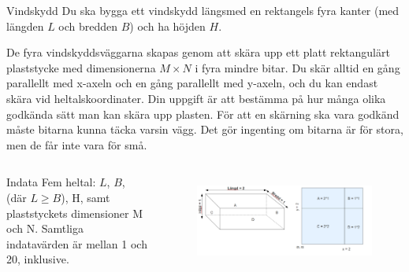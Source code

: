 \documentclass[10pt]{beamer}
\begin{document}
\begin{frame}[fragile]{Vindskydd}
Du ska bygga ett vindskydd längsmed en rektangels fyra kanter (med längden $L$ och bredden $B$) och ha höjden $H$.

De fyra vindskyddsväggarna skapas genom att skära upp ett platt rektangulärt plaststycke med dimensionerna $M \times N$ i fyra mindre bitar. Du skär alltid en gång parallellt med x-axeln och en gång parallellt med y-axeln, och du kan endast skära vid heltalskoordinater. Din uppgift är att bestämma på hur många olika godkända sätt man kan skära upp plasten. För att en skärning ska vara godkänd måste bitarna kunna täcka varsin vägg. Det gör ingenting om bitarna är för stora, men de får inte vara för små.

\vspace{-3mm}

  \begin{columns}[T,onlytextwidth]

\begin{exampleblock}{Indata}
Fem heltal: $L$, $B$, (där $L \geq B$), H, samt plaststyckets dimensioner M och N. Samtliga indatavärden är mellan 1 och 20, inklusive. 
\end{exampleblock}



\begin{figure}[!ht]
\centering
\includegraphics[width=\textwidth]{vindskydd}
\label{fig:vindskydd}
\end{figure}

\end{columns}


\end{frame}
\end{document}
